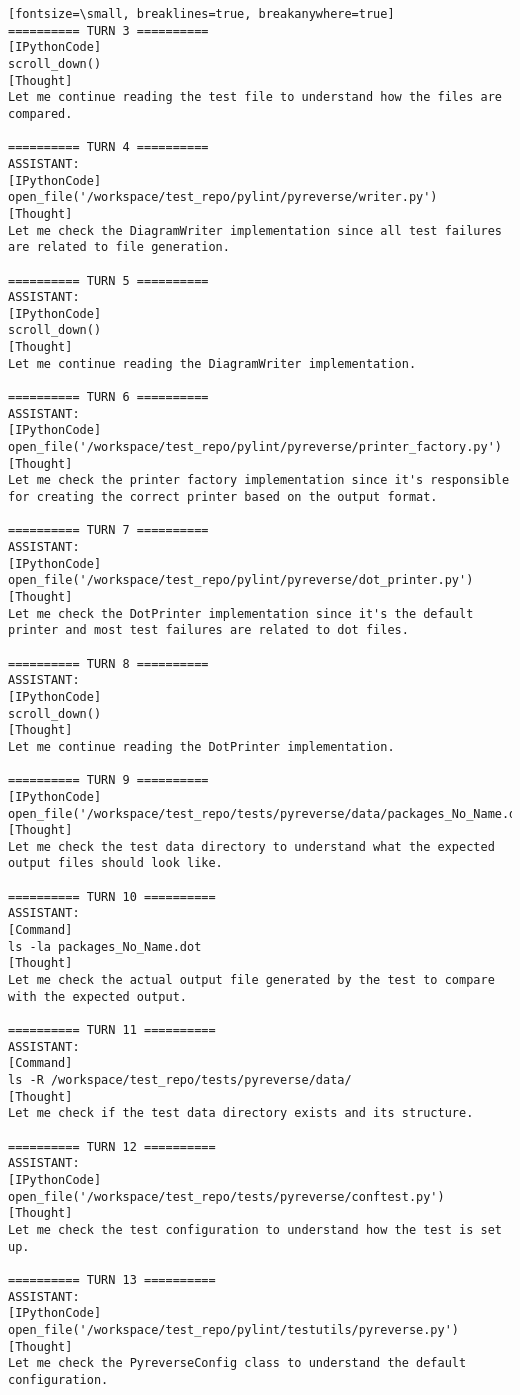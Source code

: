 \begin{verbatim}[fontsize=\small, breaklines=true, breakanywhere=true]
========== TURN 3 ==========
[IPythonCode]
scroll_down()
[Thought]
Let me continue reading the test file to understand how the files are compared.

========== TURN 4 ==========
ASSISTANT:
[IPythonCode]
open_file('/workspace/test_repo/pylint/pyreverse/writer.py')
[Thought]
Let me check the DiagramWriter implementation since all test failures are related to file generation.

========== TURN 5 ==========
ASSISTANT:
[IPythonCode]
scroll_down()
[Thought]
Let me continue reading the DiagramWriter implementation.

========== TURN 6 ==========
ASSISTANT:
[IPythonCode]
open_file('/workspace/test_repo/pylint/pyreverse/printer_factory.py')
[Thought]
Let me check the printer factory implementation since it's responsible for creating the correct printer based on the output format.

========== TURN 7 ==========
ASSISTANT:
[IPythonCode]
open_file('/workspace/test_repo/pylint/pyreverse/dot_printer.py')
[Thought]
Let me check the DotPrinter implementation since it's the default printer and most test failures are related to dot files.

========== TURN 8 ==========
ASSISTANT:
[IPythonCode]
scroll_down()
[Thought]
Let me continue reading the DotPrinter implementation.

========== TURN 9 ==========
[IPythonCode]
open_file('/workspace/test_repo/tests/pyreverse/data/packages_No_Name.dot')
[Thought]
Let me check the test data directory to understand what the expected output files should look like.

========== TURN 10 ==========
ASSISTANT:
[Command]
ls -la packages_No_Name.dot
[Thought]
Let me check the actual output file generated by the test to compare with the expected output.

========== TURN 11 ==========
ASSISTANT:
[Command]
ls -R /workspace/test_repo/tests/pyreverse/data/
[Thought]
Let me check if the test data directory exists and its structure.

========== TURN 12 ==========
ASSISTANT:
[IPythonCode]
open_file('/workspace/test_repo/tests/pyreverse/conftest.py')
[Thought]
Let me check the test configuration to understand how the test is set up.

========== TURN 13 ==========
ASSISTANT:
[IPythonCode]
open_file('/workspace/test_repo/pylint/testutils/pyreverse.py')
[Thought]
Let me check the PyreverseConfig class to understand the default configuration.


\end{verbatim}
